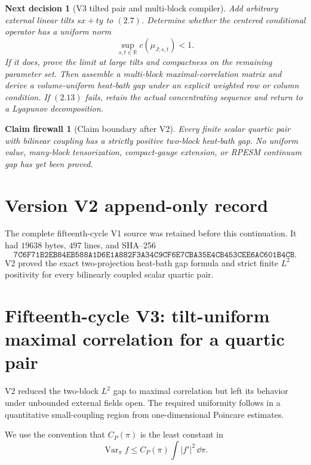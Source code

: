 \documentclass[11pt]{article}
\newtheorem{firewall}[theorem]{Claim firewall}
\newtheorem{decision}[theorem]{Next decision}
\theoremstyle{remark}
\begin{document}
\begin{decision}[V3 tilted pair and multi-block compiler]
\label{dec:v15v2-next}
Add arbitrary external linear tilts \(sx+ty\) to \((2.7)\).
Determine whether the centered conditional operator has a
uniform norm
\[
 \sup_{s,t\in\mathbb R}c(\mu_{J;s,t})<1.                     \tag{2.13}
\]
If it does, prove the limit at large tilts and compactness on the
remaining parameter set.  Then assemble a multi-block
maximal-correlation matrix and derive a volume-uniform heat-bath
gap under an explicit weighted row or column condition.  If
\((2.13)\) fails, retain the actual concentrating sequence and
return to a Lyapunov decomposition.
\end{decision}

\begin{firewall}[Claim boundary after V2]
\label{fire:v15v2}
Every finite scalar quartic pair with bilinear coupling has a
strictly positive two-block heat-bath gap.  No uniform value,
many-block tensorization, compact-gauge extension, or RPESM
continuum gap has yet been proved.
\end{firewall}

\section*{Version V2 append-only record}
The complete fifteenth-cycle V1 source was retained before this
continuation.  It had \(19638\) bytes, \(497\) lines, and SHA--256
\[
 \texttt{7C6F71B2EB84EB588A1D6E1A882F3A34C9CF6E7CBA35E4CB453CEE6AC601B4CB}.
\]
V2 proved the exact two-projection heat-bath gap formula and strict
finite \(L^2\) positivity for every bilinearly coupled scalar
quartic pair.


\section{Fifteenth-cycle V3: tilt-uniform maximal correlation for a quartic pair}
\label{sec:v15v3}

V2 reduced the two-block \(L^2\) gap to maximal correlation but
left its behavior under unbounded external fields open.  The
required uniformity follows in a quantitative small-coupling
region from one-dimensional Poincare estimates.

We use the convention that \(C_P(\pi)\) is the least constant in
\[
 \operatorname{Var}_\pi f
 \le C_P(\pi)\int|f'|^2\,\dd\pi.                              \tag{3.1}
\]
\end{document}
